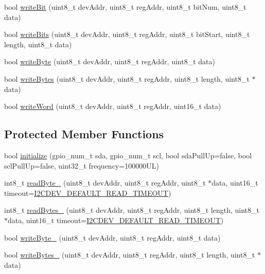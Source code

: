 \begin{DoxyCompactItemize}
\item 
bool \mbox{\hyperlink{classI2Cdev_aa68890af87de5471d32e583ebbd91acb}{write\+Bit}} (uint8\+\_\+t dev\+Addr, uint8\+\_\+t reg\+Addr, uint8\+\_\+t bit\+Num, uint8\+\_\+t data)
\item 
bool \mbox{\hyperlink{classI2Cdev_a913371251b6a41520c080115650e1b59}{write\+Bits}} (uint8\+\_\+t dev\+Addr, uint8\+\_\+t reg\+Addr, uint8\+\_\+t bit\+Start, uint8\+\_\+t length, uint8\+\_\+t data)
\item 
bool \mbox{\hyperlink{classI2Cdev_aeb297637ef985cd562da465ba61b7042}{write\+Byte}} (uint8\+\_\+t dev\+Addr, uint8\+\_\+t reg\+Addr, uint8\+\_\+t data)
\item 
bool \mbox{\hyperlink{classI2Cdev_aa4e39cac6c0eac5112f9132084bcc93e}{write\+Bytes}} (uint8\+\_\+t dev\+Addr, uint8\+\_\+t reg\+Addr, uint8\+\_\+t length, uint8\+\_\+t $\ast$data)
\item 
bool \mbox{\hyperlink{classI2Cdev_acbe68a802d6a177301736e60bedd1def}{write\+Word}} (uint8\+\_\+t dev\+Addr, uint8\+\_\+t reg\+Addr, uint16\+\_\+t data)
\end{DoxyCompactItemize}
\subsection*{Protected Member Functions}
\begin{DoxyCompactItemize}
\item 
bool \mbox{\hyperlink{classI2Cdev_a794a92b925f7970399f8b148caa5eef8}{initialize}} (gpio\+\_\+num\+\_\+t sda, gpio\+\_\+num\+\_\+t scl, bool sda\+Pull\+Up=false, bool scl\+Pull\+Up=false, uint32\+\_\+t frequency=100000\+U\+L)
\item 
int8\+\_\+t \mbox{\hyperlink{classI2Cdev_a74447cfadf4d5054ba29b726afcdecd0}{read\+Byte\+\_\+}} (uint8\+\_\+t dev\+Addr, uint8\+\_\+t reg\+Addr, uint8\+\_\+t $\ast$data, uint16\+\_\+t timeout=\mbox{\hyperlink{I2Cdev_8h_ad9726bb02451bb8f59d3d2729e4cd20e}{I2\+C\+D\+E\+V\+\_\+\+D\+E\+F\+A\+U\+L\+T\+\_\+\+R\+E\+A\+D\+\_\+\+T\+I\+M\+E\+O\+UT}})
\item 
int8\+\_\+t \mbox{\hyperlink{classI2Cdev_a3fae6b1ae9e9398b682eb7bdf6b43561}{read\+Bytes\+\_\+}} (uint8\+\_\+t dev\+Addr, uint8\+\_\+t reg\+Addr, uint8\+\_\+t length, uint8\+\_\+t $\ast$data, uint16\+\_\+t timeout=\mbox{\hyperlink{I2Cdev_8h_ad9726bb02451bb8f59d3d2729e4cd20e}{I2\+C\+D\+E\+V\+\_\+\+D\+E\+F\+A\+U\+L\+T\+\_\+\+R\+E\+A\+D\+\_\+\+T\+I\+M\+E\+O\+UT}})
\item 
bool \mbox{\hyperlink{classI2Cdev_a97645c5d6a3e295bb72b9ee5ab810d12}{write\+Byte\+\_\+}} (uint8\+\_\+t dev\+Addr, uint8\+\_\+t reg\+Addr, uint8\+\_\+t data)
\item 
bool \mbox{\hyperlink{classI2Cdev_a2f9176cd44c3163ca3929ac1c2ff601b}{write\+Bytes\+\_\+}} (uint8\+\_\+t dev\+Addr, uint8\+\_\+t reg\+Addr, uint8\+\_\+t length, uint8\+\_\+t $\ast$data)
\end{DoxyCompactItemize}
